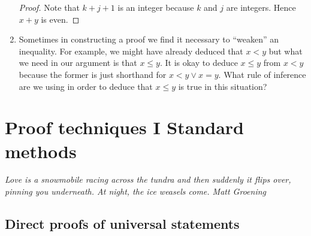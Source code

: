 \documentclass[10pt,]{book}
\theoremstyle{plain}
\theoremstyle{definition}
\theoremstyle{definition}
\numberwithin{equation}{section}
\newcommand{\hint}[1]{ }
\newcommand{\lt}{ < }
\begin{document}
\begin{enumerate}[label=(\alph*)]
\begin{proof}
          Note that \(k+j+1\) is an integer because \(k\) and \(j\) are integers.
          Hence \(x+y\) is even.
\end{proof}


      \hint{The definition for ``odd'' only involves the oddness of a single integer, but the first line of our
      proof is a conjunction claiming that \(x\) and \(y\) are both odd.  It seems that two conjunctive simplifications, followed by applications of the definition, followed by a conjunctive addition have been used in order to
      go from the first sentence to the second.}
\item\hypertarget{li-222}{}
        Sometimes in constructing a proof we find it necessary to ``weaken'' an inequality.  For example,
        we might have already deduced that \(x \lt  y\) but what we need in our argument is that \(x \leq y\).  It is
        okay to deduce \(x \leq y\) from \(x \lt  y\) because the former is just shorthand for \(x\lt y \lor x=y\).  What
        rule of inference are we using in order to deduce that \(x \leq y\) is true in this situation?

        \hint{disjunctive addition}
\end{enumerate}
\typeout{************************************************}
\typeout{************************************************}
\chapter[{Proof techniques I \textemdash{} Standard methods}]{Proof techniques I \textemdash{} Standard methods}\label{ch_proof1}
\typeout{************************************************}
\typeout{************************************************}

      \emph{Love is a snowmobile racing across the tundra and then suddenly it
      flips over, pinning you underneath. At night, the 
      ice weasels come. \textendash{}Matt Groening}
\typeout{************************************************}
\typeout{************************************************}
\section[{Direct proofs of universal statements}]{Direct proofs of universal statements}\label{sec_direct}
\end{document}
